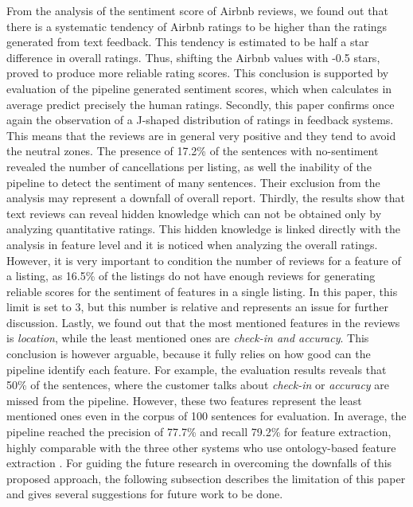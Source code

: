 From the analysis of the sentiment score of Airbnb reviews, we found out that there is a systematic tendency of Airbnb ratings to be higher than the ratings generated from text feedback. This tendency is estimated to be half a star difference in overall ratings. Thus, shifting the Airbnb values with -0.5 stars, proved to produce more reliable rating scores. This conclusion is supported by evaluation of the pipeline generated sentiment scores, which when calculates in average predict precisely the human ratings.
Secondly, this paper confirms once again the observation of a J-shaped distribution of ratings in feedback systems. This means that the reviews are in general very positive and they tend to avoid the neutral zones. The presence of 17.2\% of the sentences with no-sentiment revealed the number of cancellations per listing, as well the inability of the pipeline to detect the sentiment of many sentences. Their exclusion from the analysis may represent a downfall of overall report. Thirdly, the results show that text reviews can reveal hidden knowledge which can not be obtained only by analyzing quantitative ratings. This hidden knowledge is linked directly with the analysis in feature level and it is noticed when analyzing the overall ratings. However, it is very important to condition the number of reviews for a feature of a listing, as 16.5\% of the listings do not have enough reviews for generating reliable scores for the sentiment of features in a single listing. In this paper, this limit is set to 3, but this number is relative and represents an issue for further discussion. Lastly, we found out that the most mentioned features in the reviews is \textit{location}, while the least mentioned ones are \textit{check-in and accuracy}.  This conclusion is however arguable, because it fully relies on how good can the pipeline identify each feature. For example, the evaluation results reveals that 50\% of the sentences, where the customer talks about \textit{check-in} or \textit{accuracy} are missed from the pipeline. However, these two features represent the least mentioned ones even in the corpus of 100 sentences for evaluation. In average, the pipeline reached the precision of 77.7\% and recall 79.2\% for feature extraction, highly comparable with the three other systems who use ontology-based feature extraction \cite{eirinaki2012feature, penalver2014feature, ali2015type}. For guiding the future research in overcoming the downfalls of this proposed approach, the following subsection describes the limitation of this paper and gives several suggestions for future work to be done.

